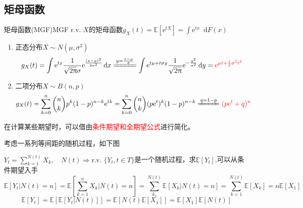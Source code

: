 \documentclass{elegantbook}
\renewcommand\d{\mathop{}\!\mathrm{d}}
\newcommand\e{\mathrm{e}}
\newcommand\E{\mathbb{E}}
\begin{document}
\subsection{矩母函数}
\begin{definition}{矩母函数(MGF)}{MGF}
    r.v. $X$的矩母函数$g_X(t)=\E [\e ^{tX}]=\int \e ^{tx}\d F(x)$
\end{definition}
\begin{enumerate}
    \item 正态分布$X\sim N(\mu,\sigma ^2)$ \[g_X(t)=\int \e ^{tx}\frac{1}{\sqrt{2\uppi}\sigma}\e ^{\frac{(x-\mu)^2}{2\sigma ^2}}\d x\xlongequal{y=\frac{x-\mu}{\sigma}}\int \e ^{t\mu+t\sigma y}\frac{1}{\sqrt{2\uppi}}\e ^{-\frac{y^2}{\sigma ^2}}\d y=\color{red}\e ^{\mu t+\frac{1}{2}\sigma ^2t^2}\]
    \item 二项分布$X\sim B(n,p)$ \[g_X(t)=\sum_{k=0}^{n}\binom{n}{k}p^k(1-p)^{n-k}\e ^{tk}=\sum_{k=0}^{n}\binom{n}{k}(p\e ^{t})^k(1-p)^{n-k}\xlongequal{q=1-p}\color{red}(p\e ^{t}+q)^n\]
\end{enumerate}
在计算某些期望时，可以借由\textcolor{red}{条件期望和全期望公式}进行简化。
\begin{example}
    考虑一系列等间距的随机过程，如下图
    \begin{center}
    \end{center}
    $Y_t=\sum_{k=1}^{N(t)}X_k,\quad N(t)\Rightarrow\text{r.v.}$ $\{Y_t,t\in T\}$是一个随机过程，求$\E [Y_t]$,可以从条件期望入手
    \[\E [Y_t|N(t)=n]=\E [\sum_{k=1}^{n}X_k|N(t)=n]=\sum_{k_1}^{N(t)}\E [X_k|N(t)=n]=\sum_{k=1}^{N(t)}\E [X_k]=n\E [X_1]\]
    \[\E [Y_t]=\E [\E [Y_t|N(t)]]=\E [N(t)\E [X_1]]=\E [X_1]\E [N(t)]\]
\end{example}
\end{document}
